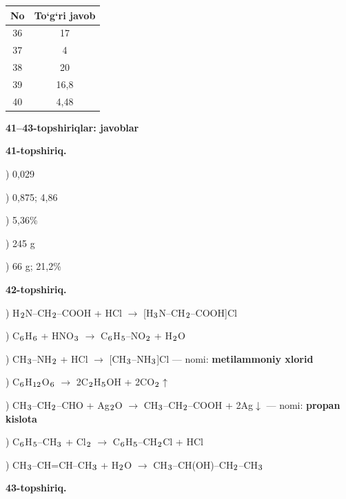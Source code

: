 \documentclass[11pt,a4paper]{article}
\renewcommand{\textsubscript}[1]{\ensuremath{_{\text{\fontsize{8}{8}\selectfont #1}}}}
\begin{document}
\noindent\begin{tabular}{|c|c|}\hline \textbf{No} & \textbf{To`g`ri javob}\\\hline
36 & 17\\\hline
37 & 4\\\hline
38 & 20\\\hline
39 & 16,8\\\hline
40 & 4,48\\\hline
\end{tabular}\par\medskip
\noindent\textbf{41--43-topshiriqlar: javoblar}\par\smallskip
\noindent\textbf{41-topshiriq.}\par
{}) 0,029\par
{}) 0,875; 4,86\par
{}) 5,36\%\par
{}) 245 g\par
{}) 66 g; 21,2\%\par
\noindent\textbf{42-topshiriq.}\par
{}) H\textsubscript{2}N--CH\textsubscript{2}--COOH + HCl $\to$ [H\textsubscript{3}N--CH\textsubscript{2}--COOH]Cl\par
{}) C\textsubscript{6}H\textsubscript{6} + HNO\textsubscript{3} $\to$ C\textsubscript{6}H\textsubscript{5}--NO\textsubscript{2} + H\textsubscript{2}O\par
{}) CH\textsubscript{3}--NH\textsubscript{2} + HCl $\to$ [CH\textsubscript{3}--NH\textsubscript{3}]Cl --- nomi: \textbf{metilammoniy xlorid}\par
{}) C\textsubscript{6}H\textsubscript{12}O\textsubscript{6} $\to$ 2C\textsubscript{2}H\textsubscript{5}OH + 2CO\textsubscript{2}$\uparrow$\par
{}) CH\textsubscript{3}--CH\textsubscript{2}--CHO + Ag\textsubscript{2}O $\to$ CH\textsubscript{3}--CH\textsubscript{2}--COOH + 2Ag$\downarrow$ --- nomi: \textbf{propan kislota}\par
{}) C\textsubscript{6}H\textsubscript{5}--CH\textsubscript{3} + Cl\textsubscript{2} $\to$ C\textsubscript{6}H\textsubscript{5}--CH\textsubscript{2}Cl + HCl\par
{}) CH\textsubscript{3}--CH=CH--CH\textsubscript{3} + H\textsubscript{2}O $\to$ CH\textsubscript{3}--CH(OH)--CH\textsubscript{2}--CH\textsubscript{3}\par
\noindent\textbf{43-topshiriq.}\par
\end{document}
